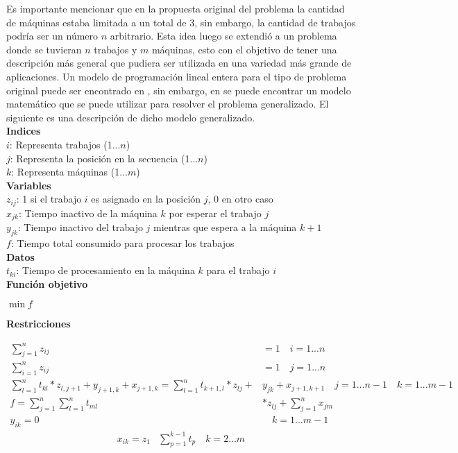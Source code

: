\documentclass[10pt, twoside]{article}
\begin{document}
Es importante mencionar que en la propuesta original del problema la cantidad
de máquinas estaba limitada a un total de 3, sin embargo, la cantidad de trabajos
podría ser un número $n$ arbitrario. Esta idea luego se extendió a un problema
donde se tuvieran $n$ trabajos y $m$ máquinas, esto con el objetivo de tener una
descripción más general que pudiera ser utilizada en una variedad
más grande de aplicaciones. Un modelo de programación lineal entera para el tipo
de problema original puede ser encontrado en \cite{old_model}, sin embargo, en
\cite{model} se puede encontrar un modelo matemático que se puede utilizar para
resolver el problema generalizado. El siguiente es una descripción de dicho
modelo generalizado.\\

\noindent
\textbf{Indices}\\
$i$: Representa trabajos (1...$n$)\\
$j$: Representa la posición en la secuencia (1...$n$)\\
$k$: Representa máquinas (1...$m$)\\

\noindent
\textbf{Variables}\\
$z_{ij}$: 1 si el trabajo $i$ es asignado en la posición $j$, 0 en otro caso\\
$x_{jk}$: Tiempo inactivo de la máquina $k$ por esperar el trabajo $j$\\
$y_{jk}$: Tiempo inactivo del trabajo $j$ mientras que espera a la máquina $k+1$\\
$f$: Tiempo total consumido para procesar los trabajos\\

\noindent
\textbf{Datos}\\
$t_{ki}$: Tiempo de procesamiento en la máquina $k$ para el trabajo $i$\\

\noindent
\textbf{Función objetivo}
\begin{center}
$\min f$
\end{center}

\noindent
\textbf{Restricciones}

\begin{align}
    \label{eq_1} \sum_{j=1}^{n} z_{ij} &= 1 \quad i=1...n \\
    \label{eq_2} \sum_{i=1}^{n} z_{ij} &= 1 \quad j=1...n \\
    \label{eq_3} \sum_{l=1}^{n}t_{kl} * z_{l,j+1} + y_{j+1,k} + x_{j+1,k} = \sum_{l=1}^{n} t_{k+1,l} * z_{lj} + &y_{jk} + x_{j+1,k+1} \quad j=1...n-1 \quad k=1...m-1\\
    \label{eq_4} f = \sum_{j=1}^{n} \sum_{l=1}^{n} t_{ml} &* z_{lj} + \sum_{j=1}^{n} x_{jm}\\
    \label{eq_5} y_{ik} = 0& \quad k=1...m-1
\end{align}
\begin{align}
    \label{eq_6} x_{ik} = z_1 &\sum_{p=1}^{k-1} t_p \quad k=2...m
\end{align}
\end{document}
